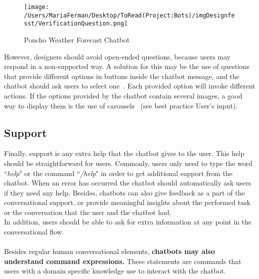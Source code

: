 \documentclass[a4paper,10pt]{article}
\begin{document}

\begin{figure}
\centering
\texttt{[image: /Users/MariaFerman/Desktop/ToRead(Project:Bots)/imgDesignfesst/VerificationQuestion.png]}
\caption{Poncho Weather Forecast Chatbot}
\label{FigureVerificationQuestion}
\end{figure}

However, designers should avoid open-ended questions, because users may respond in a non-supported way. A solution for this may be the use of questions that provide different options in buttons inside the chatbot message, and the chatbot should ask users to select one~\cite{ConversationalUXDesignFacebook}. Each provided option will invoke different actions. If the options provided by the chatbot contain several images, a good way to display them is the use of carousels~\cite{carousel} (see best practice User's input).


\subsection{Support}
Finally, support is any extra help that the chatbot gives to the user. This help should be straightforward for users. Commonly, users only need to type the word ``\textit{help}" or the command ``\textit{/help}" in order to get additional support from the chatbot. When an error has occurred the chatbot should automatically ask users if they need any help. Besides, chatbots can also give feedback as a part of the conversational support, or provide meaningful insights about the performed task or the conversation that the user and the chatbot had.\\[0\baselineskip] In addition, users should be able to ask for extra information at any point in the conversational flow.
\\
\\
Besides regular human conversational elements, \textbf{chatbots may also understand command expressions.} These statements are commands that users with a domain specific knowledge use to interact with the chatbot.

\end{document}
